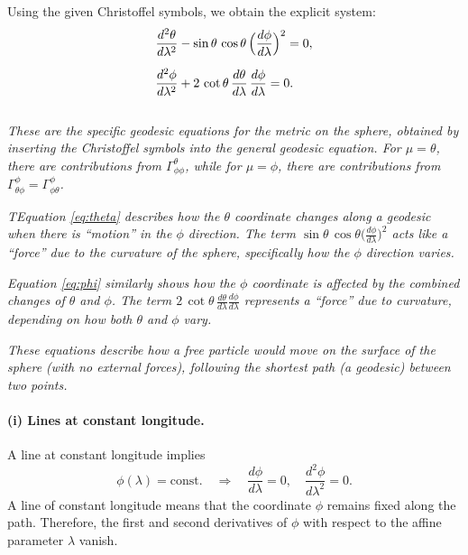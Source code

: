 \documentclass{article}
\begin{document}
Using the given Christoffel symbols, we obtain the explicit system:
\begin{align}
\frac{d^2 \theta}{d\lambda^2}
&-\sin\theta \,\cos\theta \,\Bigl(\frac{d\phi}{d\lambda}\Bigr)^2
= 0,
\label{eq:theta}\\[6pt]
\frac{d^2 \phi}{d\lambda^2}
&+ 2 \,\cot\theta\,\frac{d\theta}{d\lambda}\,\frac{d\phi}{d\lambda}
= 0.
\label{eq:phi}
\end{align}
\\
\emph{These are the specific geodesic equations for the metric on the sphere, obtained by inserting the Christoffel symbols into the general geodesic equation. For \(\mu = \theta\), there are contributions from \(\Gamma^{\theta}_{\phi\phi}\), while for \(\mu = \phi\), there are contributions from \(\Gamma^{\phi}_{\theta\phi} = \Gamma^{\phi}_{\phi\theta}\).}

\emph{TEquation \eqref{eq:theta} describes how the \(\theta\) coordinate changes along a geodesic when there is ``motion'' in the \(\phi\) direction. The term \(\sin\theta\,\cos\theta \bigl(\tfrac{d\phi}{d\lambda}\bigr)^2\) acts like a ``force'' due to the curvature of the sphere, specifically how the \(\phi\) direction varies.}

\emph{Equation \eqref{eq:phi} similarly shows how the \(\phi\) coordinate is affected by the combined changes of \(\theta\) and \(\phi\). The term \(2 \,\cot\theta\, \tfrac{d\theta}{d\lambda} \tfrac{d\phi}{d\lambda}\) represents a ``force'' due to curvature, depending on how both \(\theta\) and \(\phi\) vary.}

\emph{These equations describe how a free particle would move on the surface of the sphere (with no external forces), following the shortest path (a geodesic) between two points.}

\paragraph{(i) Lines at constant longitude.}
A line at constant longitude implies
\[
\phi(\lambda) = \text{const.}
\quad\Longrightarrow\quad
\frac{d\phi}{d\lambda} = 0, \quad
\frac{d^2\phi}{d\lambda^2} = 0.
\]
A line of constant longitude means that the coordinate \(\phi\) remains fixed along the path. Therefore, the first and second derivatives of \(\phi\) with respect to the affine parameter \(\lambda\) vanish.
\end{document}
